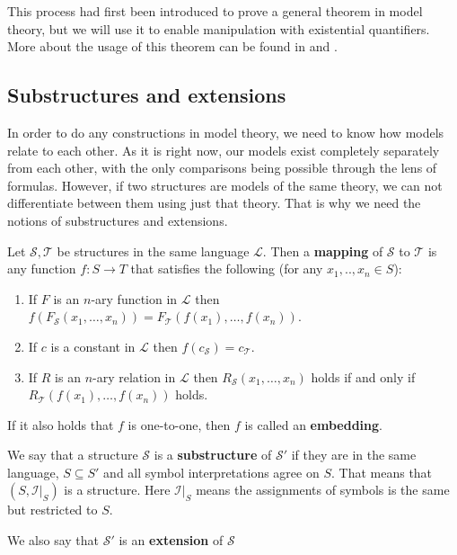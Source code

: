 This process had first been introduced to prove a general theorem in model theory, but we will use it to enable manipulation with existential quantifiers. More about the usage of this theorem can be found in \cite{logic} and \cite{model}.

\subsection{Substructures and extensions}
\label{section:extensions}

In order to do any constructions in model theory, we need to know how models relate to each other. As it is right now, our models exist completely separately from each other, with the only comparisons being possible through the lens of formulas. However, if two structures are models of the same theory, we can not differentiate between them using just that theory. That is why we need the notions of substructures and extensions.

\begin{defn}
	Let $\mathcal{S},\mathcal{T}$ be structures in the same language $\mathcal{L}$. Then a \textbf{mapping} of $\mathcal{S}$ to $\mathcal{T}$ is any function $f:S\rightarrow T$ that satisfies the following (for any $x_1,..,x_n\in S$):
	\begin{enumerate}
		\item If $F$ is an $n$-ary function in $\mathcal{L}$ then $f(F_\mathcal{S}(x_1,\dots,x_n))=F_\mathcal{T}(f(x_1),\dots,f(x_n))$.
		\item If $c$ is a constant in $\mathcal{L}$ then $f(c_\mathcal{S})=c_\mathcal{T}$.
		\item If $R$ is an $n$-ary relation in $\mathcal{L}$ then $R_\mathcal{S}(x_1,\dots,x_n)$ holds if and only if $R_\mathcal{T}(f(x_1),\dots,f(x_n))$ holds.
	\end{enumerate}
If it also holds that $f$ is one-to-one, then $f$ is called an \textbf{embedding}.
\end{defn}

\begin{defn}
	We say that a structure $\mathcal{S}$ is a \textbf{substructure} of $\mathcal{S}'$ if they are in the same language, $S\subseteq S'$ and all symbol interpretations agree on $S$. That means that $(S,\left.\mathcal{I}\right|_S)$ is a structure. Here $\left.\mathcal{I}\right|_S$ means the assignments of symbols is the same but restricted to $S$.
	
	We also say that $\mathcal{S}'$ is an \textbf{extension} of $\mathcal{S}$
\end{defn}

